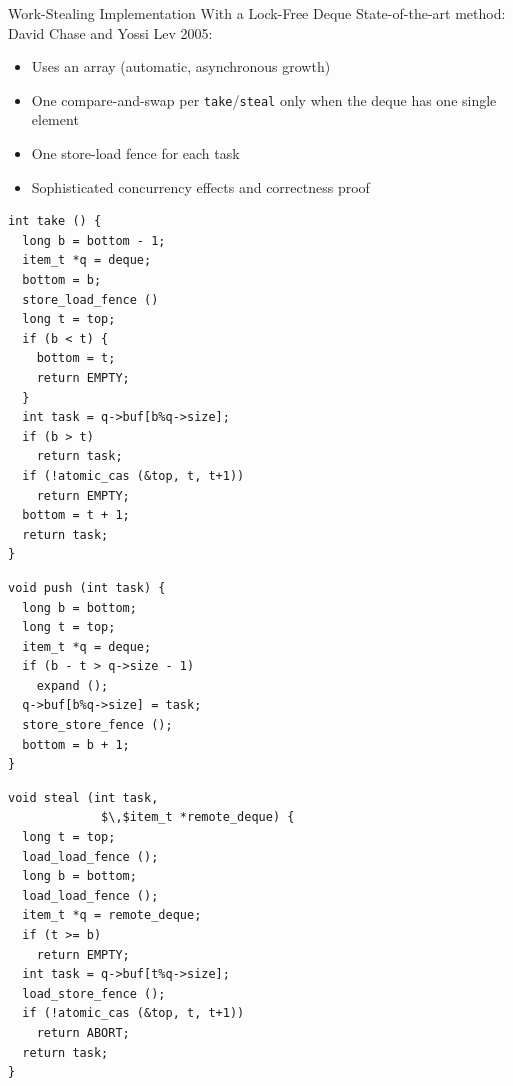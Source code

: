 \documentclass[xcolor=dvipsnames,9pt,mathserif]{beamer}
\begin{document}
\begin{frame}[fragile]{Work-Stealing Implementation With a Lock-Free Deque}
  State-of-the-art method: David Chase and Yossi Lev 2005:
  \begin{itemize}
  \item Uses an array (automatic, asynchronous growth)
  \item One compare-and-swap per \texttt{take}/\texttt{steal}
    only when the deque has one single element
  \item One store-load fence for each task
  \item Sophisticated concurrency effects and correctness proof
  \end{itemize}

  \medskip
  \begin{minipage}[t]{3.6cm}
    \begin{lstlisting}[deletekeywords={task,push}]
int take () {
  long b = bottom - 1;
  item_t *q = deque;
  bottom = b;
  store_load_fence ()
  long t = top;
  if (b < t) {
    bottom = t;
    return EMPTY;
  }
  int task = q->buf[b%q->size];
  if (b > t)
    return task;
  if (!atomic_cas (&top, t, t+1))
    return EMPTY;
  bottom = t + 1;
  return task;
}
    \end{lstlisting}
  \end{minipage}
  \hfill
  \begin{minipage}[t]{3.1cm}
    \begin{lstlisting}[deletekeywords={task,push}]
void push (int task) {
  long b = bottom;
  long t = top;
  item_t *q = deque;
  if (b - t > q->size - 1)
    expand ();
  q->buf[b%q->size] = task;
  store_store_fence ();
  bottom = b + 1;
}
    \end{lstlisting}
  \end{minipage}
  \hfill
  \begin{minipage}[t]{4.3cm}
    \begin{lstlisting}[deletekeywords={task,push}]
void steal (int task,
             $\,$item_t *remote_deque) {
  long t = top;
  load_load_fence ();
  long b = bottom;
  load_load_fence ();
  item_t *q = remote_deque;
  if (t >= b)
    return EMPTY;
  int task = q->buf[t%q->size];
  load_store_fence ();
  if (!atomic_cas (&top, t, t+1))
    return ABORT;
  return task;
}
    \end{lstlisting}
  \end{minipage}
\end{frame}
\end{document}
